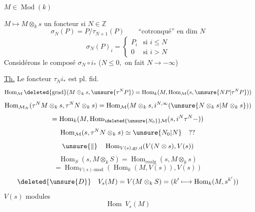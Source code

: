 \(M\in\operatorname{Mod}(k)\)

\(M\longmapsto M\otimes_k s\) un foncteur
si \(N\in\mathbb Z\)
\[
\sigma_N(P)=P/\tau_{N+1}(P)\qquad\text{``cotronqué'' en dim }N
\]
\[
\sigma_N(P)_i=\begin{cases}P_i&\text{si }i\leq N\\0&\text{si }i>N\end{cases}
\]
Considérons le composé \(\sigma_N\circ i_*\) (\(N\leq0,\) on fait \(N\longrightarrow-\infty\))

\uline{Th.} Le foncteur \(\tau_N i_*\) est pl. fid.
\[
\operatorname{Hom}_{\mathcal M}\deleted{\text{grad}}(M\otimes_k s,\unsure{\tau^N P})=
\operatorname{Hom}_k(M,\operatorname{Hom}_{\mathcal M}(s,\unsure{NP|\tau^N P}))
\]
\[
\operatorname{Hom}_{\mathcal M_N}(\tau^N M\otimes_k s,\tau^N N\otimes_k s)=
\operatorname{Hom}_{\mathcal M}(M\otimes_k s,i^{N,\infty}(\unsure{N\otimes_k s|M\otimes_k s}))
\]
\[
=\operatorname{Hom}_k(M,\operatorname{Hom}_{\deleted{\unsure{N_0}}\mathcal M}(s,i^{N}\tau^N-))
\]
\[
\operatorname{Hom}_{\mathcal M}(s,\tau^N N\otimes_k s)\simeq\unsure{N_0|N}\quad??
\]
\[
\unsure{\Vert}\quad\operatorname{Hom}_{V(s),\mathrm{gr.d}}(V(N\otimes s),V(s))
\]
\[
\operatorname{Hom}_S(s,M\otimes_k S)=
\operatorname{Hom}_{\mathrm{coalg}}(s,M\otimes_k s)
\]
\[
=\operatorname{Hom}_{V(s)\text{-mod}}(\operatorname{Hom}_k(M,V(s)),V(s))
\]
\[
\deleted{\unsure{D}}\quad V_s(M)=V(M\otimes_k S)
=(k'\longmapsto\operatorname{Hom}_k(M,s^{k'}))
\]
\(V(s)\) modules
\[
\operatorname{Hom}\ V_s(M)
\]
